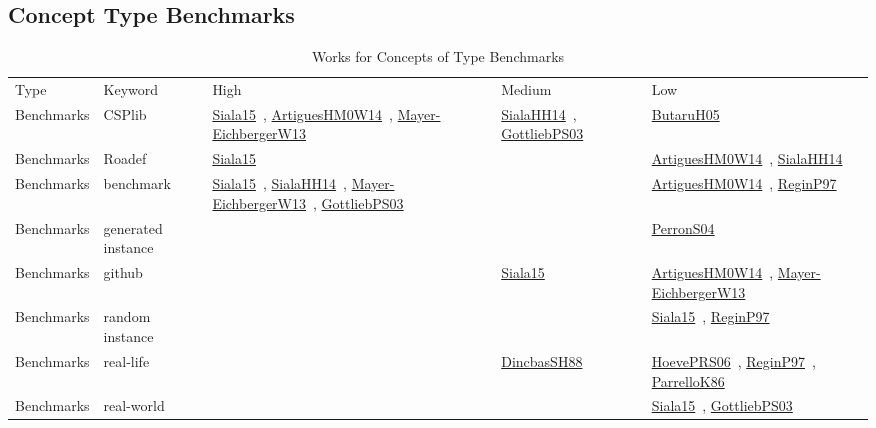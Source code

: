 \clearpage
\subsection{Concept Type Benchmarks}
\label{sec:Benchmarks}
{\scriptsize
\begin{longtable}{lp{3cm}>{\raggedright\arraybackslash}p{6cm}>{\raggedright\arraybackslash}p{6cm}>{\raggedright\arraybackslash}p{8cm}}
\rowcolor{white}\caption{Works for Concepts of Type Benchmarks}\\ \toprule
\rowcolor{white}Type & Keyword & High & Medium & Low\\ \midrule\endhead
\bottomrule
\endfoot
Benchmarks & CSPlib & \href{../cars/works/Siala15.pdf}{Siala15}~\cite{Siala15}, \href{../cars/works/ArtiguesHM0W14.pdf}{ArtiguesHM0W14}~\cite{ArtiguesHM0W14}, \href{../cars/works/Mayer-EichbergerW13.pdf}{Mayer-EichbergerW13}~\cite{Mayer-EichbergerW13} & \href{../cars/works/SialaHH14.pdf}{SialaHH14}~\cite{SialaHH14}, \href{../cars/works/GottliebPS03.pdf}{GottliebPS03}~\cite{GottliebPS03} & \href{../cars/works/ButaruH05.pdf}{ButaruH05}~\cite{ButaruH05}\\
Benchmarks & Roadef & \href{../cars/works/Siala15.pdf}{Siala15}~\cite{Siala15} &  & \href{../cars/works/ArtiguesHM0W14.pdf}{ArtiguesHM0W14}~\cite{ArtiguesHM0W14}, \href{../cars/works/SialaHH14.pdf}{SialaHH14}~\cite{SialaHH14}\\
Benchmarks & benchmark & \href{../cars/works/Siala15.pdf}{Siala15}~\cite{Siala15}, \href{../cars/works/SialaHH14.pdf}{SialaHH14}~\cite{SialaHH14}, \href{../cars/works/Mayer-EichbergerW13.pdf}{Mayer-EichbergerW13}~\cite{Mayer-EichbergerW13}, \href{../cars/works/GottliebPS03.pdf}{GottliebPS03}~\cite{GottliebPS03} &  & \href{../cars/works/ArtiguesHM0W14.pdf}{ArtiguesHM0W14}~\cite{ArtiguesHM0W14}, \href{../cars/works/ReginP97.pdf}{ReginP97}~\cite{ReginP97}\\
Benchmarks & generated instance &  &  & \href{../cars/works/PerronS04.pdf}{PerronS04}~\cite{PerronS04}\\
Benchmarks & github &  & \href{../cars/works/Siala15.pdf}{Siala15}~\cite{Siala15} & \href{../cars/works/ArtiguesHM0W14.pdf}{ArtiguesHM0W14}~\cite{ArtiguesHM0W14}, \href{../cars/works/Mayer-EichbergerW13.pdf}{Mayer-EichbergerW13}~\cite{Mayer-EichbergerW13}\\
Benchmarks & random instance &  &  & \href{../cars/works/Siala15.pdf}{Siala15}~\cite{Siala15}, \href{../cars/works/ReginP97.pdf}{ReginP97}~\cite{ReginP97}\\
Benchmarks & real-life &  & \href{../cars/works/DincbasSH88.pdf}{DincbasSH88}~\cite{DincbasSH88} & \href{../cars/works/HoevePRS06.pdf}{HoevePRS06}~\cite{HoevePRS06}, \href{../cars/works/ReginP97.pdf}{ReginP97}~\cite{ReginP97}, \href{../cars/works/ParrelloK86.pdf}{ParrelloK86}~\cite{ParrelloK86}\\
Benchmarks & real-world &  &  & \href{../cars/works/Siala15.pdf}{Siala15}~\cite{Siala15}, \href{../cars/works/GottliebPS03.pdf}{GottliebPS03}~\cite{GottliebPS03}\\
\end{longtable}
}

